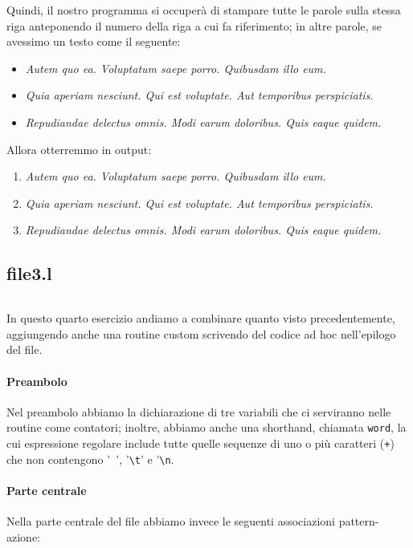 \documentclass[class=book, crop=false, oneside, 12pt]{standalone}
\begin{document}
\noindent Quindi, il nostro programma si occuperà di stampare tutte le parole sulla stessa riga anteponendo il numero della riga a cui fa riferimento; in altre parole, se avessimo un testo come il seguente:
\begin{itemize}[noitemsep]
    \item[] \emph{Autem quo ea. Voluptatum saepe porro. Quibusdam illo eum.}
    \item[] \emph{Quia aperiam nesciunt. Qui est voluptate. Aut temporibus perspiciatis.}
    \item[] \emph{Repudiandae delectus omnis. Modi earum doloribus. Quis eaque quidem.}
\end{itemize}
Allora otterremmo in output:
\begin{enumerate}[noitemsep]
    \item[\texttt{1}] \emph{Autem quo ea. Voluptatum saepe porro. Quibusdam illo eum.}
    \item[\texttt{2}] \emph{Quia aperiam nesciunt. Qui est voluptate. Aut temporibus perspiciatis.}
    \item[\texttt{3}] \emph{Repudiandae delectus omnis. Modi earum doloribus. Quis eaque quidem.}
\end{enumerate}


\subsection*{file3.l}

\inputminted[linenos, breaklines, tabsize = 2, fontsize = \small]{c}{assets/code-fragments/file3.l}

In questo quarto esercizio andiamo a combinare quanto visto precedentemente, aggiungendo anche una routine custom scrivendo del codice ad hoc nell'epilogo del file.

\paragraph{Preambolo}
Nel preambolo abbiamo la dichiarazione di tre variabili che ci serviranno nelle routine come contatori; inoltre, abbiamo anche una shorthand, chiamata \texttt{word}, la cui espressione regolare include tutte quelle sequenze di uno o più caratteri (\texttt{+}) che non contengono '\texttt{ }', '\texttt{\textbackslash t}' e '\texttt{\textbackslash n}.

\paragraph{Parte centrale}
Nella parte centrale del file abbiamo invece le seguenti associazioni pattern-azione:
\end{document}
